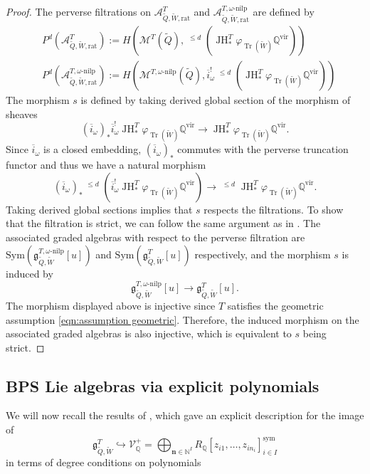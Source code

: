 \documentclass{amsart}
\def\BQ{{\mathbb{Q}}}
\DeclareMathOperator{\Tr}{\mathrm{Tr}}
\def\vir{\mathrm{vir}}
\DeclareMathOperator{\ptau}{{}^{\mathfrak{p}}\tau}
\DeclareMathOperator{\JH}{\mathrm{JH}}
\def\oi{\overline{i}}
\def\CV{{\mathcal{V}}}
\def\sym{\textrm{sym}}
\def\nn{{\mathbb{N}^I}}
\def\bn{{\boldsymbol{n}}}
\def\tQ{\tilde{Q}}
\def\tW{\tilde{W}}
\def\ring{R}
\def\khrat{\mathcal{A}^{T}_{\tQ,\tW,\text{rat}}}
\def\kharat{\mathcal{A}^{T,\omega\text{-nilp}}_{\tQ,\tW,\text{rat}}}
\def\tbpsw{\mathfrak{g}^{T,\omega\text{-nilp}}_{\tilde{Q},\tilde{W}}}
\def\tbps{\mathfrak{g}^T_{\tilde{Q},\tilde{W}}}
\begin{document}
\begin{proof}
The perverse filtrations on $\khrat$ and $\kharat$ are defined by 
\begin{align*} 
&P^d(\khrat) := H(\mathcal{M}^T(\tilde{Q}), \ptau^{\leq d} (\JH^T_{*} \varphi_{\Tr(\tilde{W})} \mathbb{Q}^{\vir})) \\
&P^d(\kharat) := H(\mathcal{M}^{T,\omega\text{-nilp}}(\tilde{Q}),\oi^{!}_{\omega} \ptau^{\leq d}(\JH^T_{*} \varphi_{\Tr(\tilde{W})} \mathbb{Q}^{\vir})) 
\end{align*} 
The morphism $s$ is defined by taking derived global section of the morphism of sheaves
\[ (\oi_\omega)_* \oi_{\omega}^! \JH^T_{*} \varphi_{\Tr(\tilde{W})} \mathbb{Q}^{\vir} \rightarrow \JH^T_{*} \varphi_{\Tr(\tilde{W})} \mathbb{Q}^{\vir}.\] Since $\oi_\omega$ is a closed embedding, $(\oi_\omega)_*$ commutes with the perverse truncation functor and thus we have a natural morphism
 \[ (\oi_\omega)_{*} \ptau^{\leq d}(\oi_{\omega}^! \JH^T_{*} \varphi_{\Tr(\tilde{W})} \mathbb{Q}^{\vir}) \rightarrow \ptau^{\leq d} \JH^T_{*} \varphi_{\Tr(\tilde{W})} \mathbb{Q}^{\vir}.\]
 Taking derived global sections implies that $s$ respects the filtrations. To show that the filtration is strict, we can follow the same argument as in \cite[Proposition 3.18]{jindalnegutbps}. The associated graded algebras with respect to the perverse filtration are $\mathrm{Sym}(\tbpsw[u])$ and $\mathrm{Sym}(\tbps[u])$ respectively, and the morphism $s$ is induced by 
 $$
 \tbpsw[u] \rightarrow \tbps[u].
 $$
 The morphism displayed above is injective since $T$ satisfies the geometric assumption \eqref{eqn:assumption geometric}. Therefore, the induced morphism on the associated graded algebras is also injective, which is equivalent to $s$ being strict. \end{proof}

\medskip

\subsection{BPS Lie algebras via explicit polynomials}
\label{sub:bps explicit}

We will now recall the results of \cite{jindalnegutbps}, which gave an explicit description for the image of
\begin{equation}
\label{eqn:inclusion}
\tbps \hookrightarrow \CV_{\BQ}^+ = \bigoplus_{\bn \in \nn} \ring_{\BQ}[z_{i1},\dots,z_{in_i}]^{\sym}_{i \in I}
\end{equation}
in terms of degree conditions on polynomials
\end{document}
